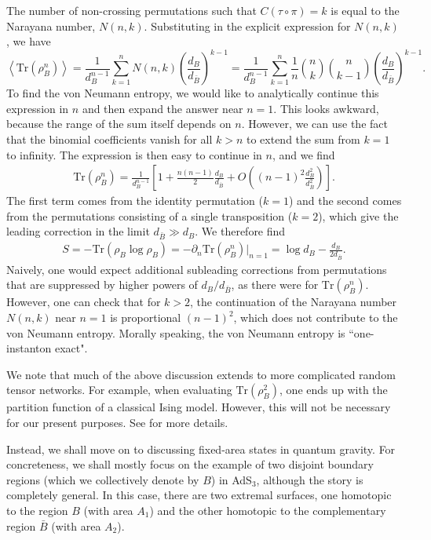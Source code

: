 \documentclass[12pt]{article}
\newcommand{\be}{\begin{equation}}
\newcommand{\ee}{\end{equation}}
\numberwithin{equation}{section}
\def\tr{\text{Tr}}
\begin{document}
The number of non-crossing permutations such that $C(\tau\circ\pi) = k$ is equal to the Narayana number, $N(n,k)$. Substituting in the explicit expression for $N(n,k)$, we have
\be
\left\langle \tr (\rho_B^n)\right \rangle = \frac{1}{d_B^{n-1}}\sum_{k = 1}^n N(n,k) \left(\frac{d_B}{d_{\bar B}}\right)^{k-1} = \frac{1}{d_B^{n-1}}\sum_{k = 1}^n \frac{1}{n}\binom{n}{k}\binom{n}{k-1} \left(\frac{d_B}{d_{\bar B}}\right)^{k-1}.
\ee
To find the von Neumann entropy, we would like to analytically continue this expression in $n$ and then expand the answer near $n = 1$. This looks awkward, because the range of the sum itself depends on $n$. However, we can use the fact that the binomial coefficients vanish for all $k>n$ to extend the sum from $k = 1$ to infinity. The expression is then easy to continue in $n$, and we find
\begin{align}
\tr(\rho_B^n) = \frac{1}{d_B^{n-1}} \left[ 1 + \frac{n(n-1)}{2}\frac{d_B}{d_{\bar B}} + O\left((n-1)^2 \frac{d_B^2}{d_{\bar B}^2}\right)\right].
\end{align}
The first term comes from the identity permutation ($k = 1$) and the second comes from the permutations consisting of a single transposition ($k = 2$), which give the leading correction in the limit $d_{\bar B} \gg d_B$. We therefore find
\begin{align}
S = - \tr(\rho_B \log \rho_B) = - \partial_n \tr(\rho_B^n)|_{n=1} = \log d_B - \frac{d_B}{2 d_{\bar B}}.
\end{align} 
Naively, one would expect additional subleading corrections from permutations that are suppressed by higher powers of $d_B/d_{\bar B}$, as there were for $\tr(\rho_B^n)$. However, one can check that for $k>2$, the continuation of the Narayana number $N(n,k)$ near $n =1$ is proportional $(n-1)^2$, which does not contribute to the von Neumann entropy. Morally speaking, the von Neumann entropy is ``one-instanton exact".

We note that much of the above discussion extends to more complicated random tensor networks. For example, when evaluating $\tr(\rho_B^2)$, one ends up with the partition function of a classical Ising model. However, this will not be necessary for our present purposes. See \cite{Hayden:2016cfa} for more details.

Instead, we shall move on to discussing fixed-area states in quantum gravity. For concreteness, we shall mostly focus on the example of two disjoint boundary regions  (which we collectively denote by $B$) in AdS$_3$, although the story is completely general. In this case, there are two extremal surfaces, one homotopic to the region $B$ (with area $A_1$) and the other homotopic to the complementary region $\bar B$ (with area $A_2$). 
\end{document}
